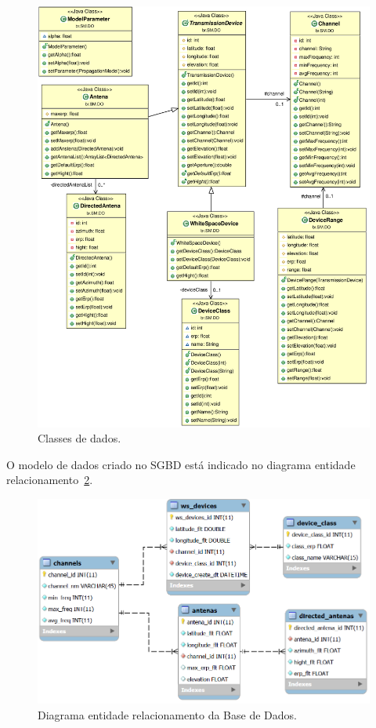 \begin{figure}[htb]
\centering
\includegraphics[width=1.0\textwidth]{figs/do}
\caption[Classes de Dados (DO).]
{Classes de dados.}
\label{fig:DO}
\end{figure} 

O modelo de dados criado no SGBD está indicado no diagrama entidade relacionamento~\ref{fig:ER}.


\begin{figure}[htb]
\centering
\includegraphics[width=1.0\textwidth]{figs/er}
\caption[Diagrama Entidade Relacionamento.]
{Diagrama entidade relacionamento da Base de Dados.}
\label{fig:ER}
\end{figure} 



